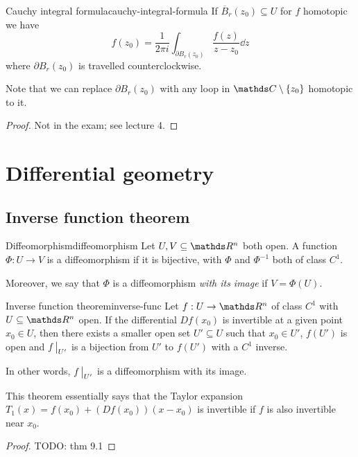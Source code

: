 \documentclass[12pt]{extarticle}
\begin{document}
\begin{theorem}{Cauchy integral formula}{cauchy-integral-formula}
	If $\overline B_r(z_0) \subseteq U$ for $f$ homotopic we have
	\begin{equation}
		f(z_0) = \frac{1}{2 \pi i} \int_{\partial B_r(z_0)} \frac{f(z)}{z - z_0} \dd z
	\end{equation}
	where $\partial B_r(z_0)$ is travelled counterclockwise.
\end{theorem}

Note that we can replace $\partial B_r(z_0)$ with any loop in $\C \setminus \{z_0\}$
homotopic to it.

\begin{proof}
	Not in the exam; see lecture 4.
\end{proof}

\section{Differential geometry}

\subsection{Inverse function theorem}

\begin{definition}{Diffeomorphism}{diffeomorphism}
	Let $U, V \subseteq \R^n$ both open. A function $\Phi : U \to V$ is a diffeomorphism if it is
	bijective, with $\Phi$ and $\Phi^{-1}$ both of class $C^1$.

	Moreover, we say that $\Phi$ is a diffeomorphism \emph{with its image} if $V = \Phi(U)$.
\end{definition}

\begin{theorem}{Inverse function theorem}{inverse-func}
	Let $f: U \to \R^n$ of class $C^1$ with $U \subseteq \R^n$ open.
	If the differential $Df(x_0)$ is invertible at a given point $x_0 \in U$, then there exists a
	smaller open set $U' \subseteq U$ such that $x_0 \in U'$, $f(U')$ is open and $f \eval_{U'}$ is a
	bijection from $U'$ to $f(U')$ with a $C^1$ inverse.

	In other words, $f\eval_{U'}$ is a diffeomorphism with its image.
\end{theorem}

This theorem essentially says that the Taylor expansion $T_1(x) = f(x_0) + (Df(x_0))(x-x_0)$ is
invertible if $f$ is also invertible near $x_0$.

\begin{proof}
	TODO: thm 9.1
\end{proof}
\end{document}
